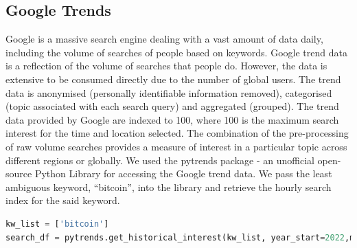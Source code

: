 \subsection*{Google Trends}
Google is a massive search engine dealing with a vast amount of data daily, including the volume of searches of people based on keywords. Google trend data is a reflection of the volume of searches that people do. However, the data is extensive to be consumed directly due to the number of global users. The trend data is anonymised (personally identifiable information removed), categorised (topic associated with each search query) and aggregated (grouped). The trend data provided by Google are indexed to 100, where 100 is the maximum search interest for the time and location selected. The combination of the pre-processing of raw volume searches provides a measure of interest in a particular topic across different regions or globally.
We used the pytrends package - an unofficial open-source Python Library for accessing the Google trend data. We pass the least ambiguous keyword, “bitcoin”, into the library and retrieve the hourly search index for the said keyword.

\begin{lstlisting}[language=Python, caption= {pytrend query to get google trend index withing each hour between predefined start time and end time}, label = pytrend_search]
kw_list = ['bitcoin']
search_df = pytrends.get_historical_interest(kw_list, year_start=2022,month_start=6, day_start=1, hour_start=0, year_end=2022,month_end=7, day_end=16, hour_end=0,cat=0, geo='', gprop='')
\end{lstlisting}

